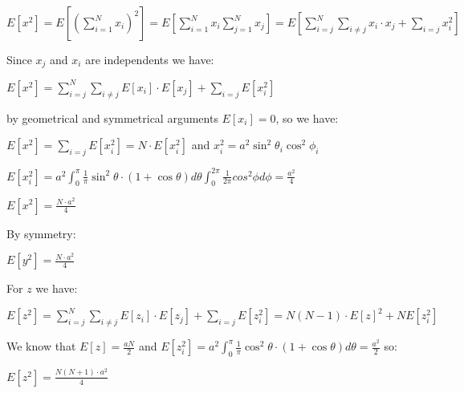 \documentclass[paper=9in:6in,pagesize=pdftex,headinclude=on,footinclude=on,10pt,bibtotoc,pointlessnumbers,normalheadings,DIV=9,twoside=false]{scrbook}
\begin{document}
\begin{center}
$E[x^2]= E[(\sum_{i=1}^{N} x_i)^2]= E[\sum_{i=1}^{N} x_i\sum_{j=1}^{N} x_j] = E[\sum\limits_{i=j}^{N}\sum\limits_{i\neq j}^{}x_i\cdotp x_j + \sum\limits_{i=j}^{}x_i^2]$\\
\end{center}
\begin{text}
Since $x_j$ and $x_i$ are independents we have:\\
\end{text}

\begin{center}
$E[x^2]= \sum\limits_{i=j}^{N}\sum\limits_{i\neq j}^{}E[x_i]\cdotp E[x_j] + \sum\limits_{i=j}^{}E[x_i^2]$\\
\end{center}

\begin{text}
 by geometrical and symmetrical arguments $E[x_{i}]=0$,  so we have:
\end{text}

\begin{center}
    $E[x^2]=  \sum\limits_{i=j}^{}E[x_i^2]=N\cdotp E[x_i^2]$ and $x_i^2=a^2\sin^2{\theta_{i}}\cos^2{\phi_{i}}$\\
\end{center}
\begin{center}
    $E[x_i^2]=a^2\int_{0}^{\pi} \frac{1}{\pi} \sin^2{\theta}\cdotp(1+\cos{\theta}) d\theta\int_{0}^{2\pi}\frac{1}{2\pi}cos^2{\phi} d\phi = \frac{a^2}{4}$ \\
\end{center}

\begin{center}
    $E[x^2]= \frac{N\cdotp a^2}{4}$ \\
\end{center}

\begin{text}
By symmetry:\\
\end{text}
\begin{center}
    $E[y^2]= \frac{N\cdotp a^2}{4}$ \\
\end{center}

\begin{text}
For $z$ we have:\\
\end{text}

\begin{center}
  $E[z^2]= \sum\limits_{i=j}^{N}\sum\limits_{i\neq j}^{}E[z_i]\cdotp E[z_j] + \sum\limits_{i=j}^{}E[z_i^2]= N(N-1)\cdotp E[z]^2 + N E[z_i^2]$ \\  
\end{center}
\begin{text}
We know that $E[z]=\frac{aN}{2}$ and $E[z_i^2] = a^2 \int_{0}^{\pi} \frac{1}{\pi} \cos^2{\theta}\cdotp(1+\cos{\theta}) d\theta=\frac{a^2}{2}$ so:\\
\end{text}
\begin{center}
  $E[z^2]=\frac{N(N+1)\cdotp a^2 }{4} $
\end{center}
\end{document}
